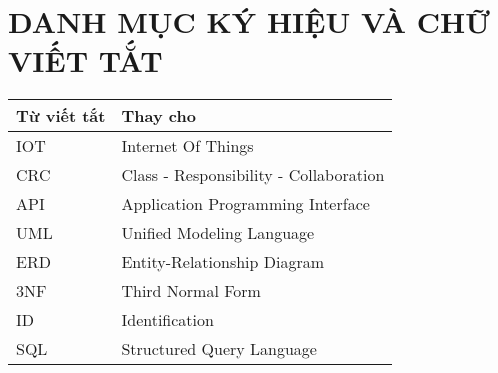 


\clearpage
\pagestyle{empty} %
{}
\tableofcontents %

\clearpage
\pagestyle{plain} %

\cleardoublepage

\section*{DANH MỤC KÝ HIỆU VÀ CHỮ VIẾT TẮT}%

\begin{table}[H]
	\centering
	\begin{tabularx}{0.85\textwidth}{
		| >{\centering\arraybackslash}m{3cm}
		| >{\centering\arraybackslash}X|
		}
		\hline
		\bfseries Từ viết tắt & \bfseries Thay cho\hspace{1cm}               \\ \hline
        IOT                   & Internet Of Things                           \\ \hline
		CRC                   & Class - Responsibility - Collaboration       \\ \hline
		API                   & Application Programming Interface            \\ \hline
		UML                   & Unified Modeling Language                    \\ \hline
		ERD                   & Entity-Relationship Diagram                  \\ \hline
		3NF                   & Third Normal Form                            \\ \hline
		ID                    & Identification                               \\ \hline
		SQL                   & Structured Query Language                    \\ \hline
	\end{tabularx}
\end{table}
\cleardoublepage

{
	\let\oldnumberline\numberline
	\renewcommand{\numberline}{\figurename~\oldnumberline}%
	\listoffigures
} %
\cleardoublepage

{
	\let\oldnumberline\numberline
	\renewcommand{\numberline}{\tablename~\oldnumberline}%
	\listoftables
} %
\cleardoublepage
